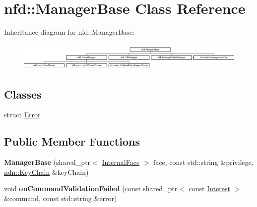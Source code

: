 \hypertarget{classnfd_1_1ManagerBase}{}\section{nfd\+:\+:Manager\+Base Class Reference}
\label{classnfd_1_1ManagerBase}
Inheritance diagram for nfd\+:\+:Manager\+Base\+:\begin{figure}[H]
\begin{center}
\leavevmode
\includegraphics[height=1.400000cm]{classnfd_1_1ManagerBase}
\end{center}
\end{figure}
\subsection*{Classes}
\begin{DoxyCompactItemize}
\item 
struct \hyperlink{structnfd_1_1ManagerBase_1_1Error}{Error}
\end{DoxyCompactItemize}
\subsection*{Public Member Functions}
\begin{DoxyCompactItemize}
\item 
{\bfseries Manager\+Base} (shared\+\_\+ptr$<$ \hyperlink{classnfd_1_1InternalFace}{Internal\+Face} $>$ face, const std\+::string \&privilege, \hyperlink{classndn_1_1security_1_1KeyChain}{ndn\+::\+Key\+Chain} \&key\+Chain)\hypertarget{classnfd_1_1ManagerBase_aa46a60f0360c016dabd5c994f52b689c}{}\label{classnfd_1_1ManagerBase_aa46a60f0360c016dabd5c994f52b689c}

\item 
void {\bfseries on\+Command\+Validation\+Failed} (const shared\+\_\+ptr$<$ const \hyperlink{classndn_1_1Interest}{Interest} $>$ \&command, const std\+::string \&error)\hypertarget{classnfd_1_1ManagerBase_a481f0199c480907669bb5de76b5bf902}{}\label{classnfd_1_1ManagerBase_a481f0199c480907669bb5de76b5bf902}

\end{DoxyCompactItemize}
